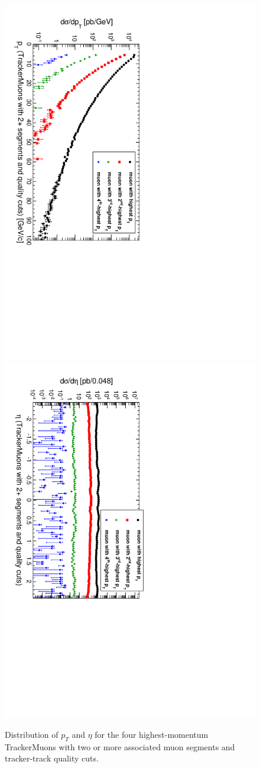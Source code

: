 \documentclass[12pt]{article}
\begin{document}
\begin{figure}
\includegraphics[height=0.5\linewidth, angle=90]{fig/backgroundsMatching_plot/ptcurves_TwoChambersGoodTracker.pdf}
\includegraphics[height=0.5\linewidth, angle=90]{fig/backgroundsMatching_plot/etacurves_TwoChambersGoodTracker.pdf}

\caption{Distribution of $p_T$ and $\eta$ for the four highest-momentum TrackerMuons with two or more associated muon segments and tracker-track quality cuts. \label{fig:curves_TwoChambersGoodTracker}}
\end{figure}
\end{document}
